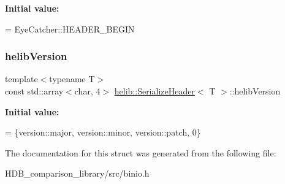 {\bfseries Initial value\+:}
\begin{DoxyCode}
=
      EyeCatcher::HEADER\_BEGIN
\end{DoxyCode}
\mbox{\label{structhelib_1_1SerializeHeader_aa2e666285a108c958c05d6bc77ef2155}} 
\subsubsection{\texorpdfstring{helib\+Version}{helibVersion}}
{\footnotesize\ttfamily template$<$typename T$>$ \\
const std\+::array$<$char, 4$>$ \hyperlink{structhelib_1_1SerializeHeader}{helib\+::\+Serialize\+Header}$<$ T $>$\+::helib\+Version}

{\bfseries Initial value\+:}
\begin{DoxyCode}
= \{version::major,
                                            version::minor,
                                            version::patch,
                                            0\}
\end{DoxyCode}


The documentation for this struct was generated from the following file\+:\begin{DoxyCompactItemize}
\item 
H\+D\+B\+\_\+comparison\+\_\+library/src/binio.\+h\end{DoxyCompactItemize}
